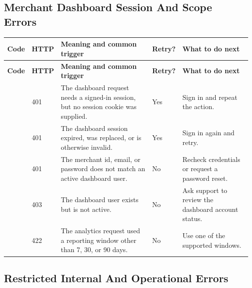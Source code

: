 \subsection{Merchant Dashboard Session And Scope Errors}

{\footnotesize
\setlength{\tabcolsep}{4pt}
\begin{longtable}{@{}L{0.21\textwidth}L{0.07\textwidth}L{0.36\textwidth}L{0.08\textwidth}L{0.18\textwidth}@{}}
\toprule
\textbf{Code} & \textbf{HTTP} & \textbf{Meaning and common trigger} &
\textbf{Retry?} & \textbf{What to do next} \\
\midrule
\endfirsthead
\toprule
\textbf{Code} & \textbf{HTTP} & \textbf{Meaning and common trigger} &
\textbf{Retry?} & \textbf{What to do next} \\
\midrule
\endhead
{} & 401 & The dashboard request needs a signed-in
session, but no session cookie was supplied. & Yes & Sign in and repeat the
action. \\
\bodyrowrule
{} & 401 & The dashboard session expired,
was replaced, or is otherwise invalid. & Yes & Sign in again and retry. \\
\bodyrowrule
{} & 401 & The merchant id, email, or
password does not match an active dashboard user. & No & Recheck credentials or
request a password reset. \\
\bodyrowrule
{} & 403 & The dashboard user exists but is not
active. & No & Ask support to review the dashboard account status. \\
\bodyrowrule
{} & 422 & The analytics request used a reporting
window other than 7, 30, or 90 days. & No & Use one of the supported windows. \\
\bottomrule
\end{longtable}
}

\subsection{Restricted Internal And Operational Errors}

